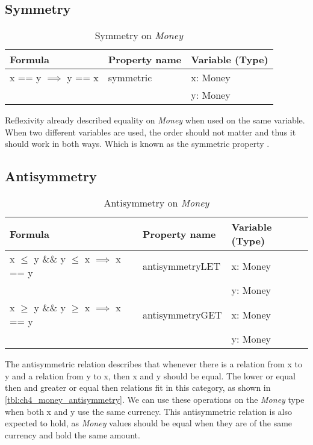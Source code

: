 \subsection*{Symmetry}
\FloatBarrier
\begin{table}[!ht]
\centering
\begin{tabular}{lll}
\hline
                        \textbf{Formula}         & \textbf{Property name} & \textbf{Variable (Type)} \\ \hline
\rowcolor[HTML]{EFEFEF} x == y $\implies$ y == x & symmetric              & x: Money                 \\
\rowcolor[HTML]{EFEFEF}                          &                        & y: Money                 \\ \hline
\end{tabular}
\caption{Symmetry on \textit{Money}}
\label{tbl:ch4_money_symmetry}
\end{table}
\FloatBarrier
Reflexivity already described equality on \textit{Money} when used on the same variable. When two different variables are used, the order should not matter and thus it should work in both ways. Which is known as the symmetric property \cite{raftery2011perspective}.

\subsection*{Antisymmetry}
\FloatBarrier
\begin{table}[!ht]
\centering
\begin{tabular}{lll}
\hline
                        \textbf{Formula}                             & \textbf{Property name} & \textbf{Variable (Type)} \\ \hline
\rowcolor[HTML]{EFEFEF} x $\leq$ y \&\& y $\leq$ x $\implies$ x == y & antisymmetryLET        & x: Money                 \\
\rowcolor[HTML]{EFEFEF}                                              &                        & y: Money                 \\
                        x $\geq$ y \&\& y $\geq$ x $\implies$ x == y & antisymmetryGET        & x: Money                 \\
                                                                     &                        & y: Money                 \\ \hline
\end{tabular}
\caption{Antisymmetry on \textit{Money}}
\label{tbl:ch4_money_antisymmetry}
\end{table}
\FloatBarrier
The antisymmetric relation describes that whenever there is a relation from x to y and a relation from y to x, then x and y should be equal. The lower or equal then and greater or equal then relations fit in this category, as shown in \autoref{tbl:ch4_money_antisymmetry}. We can use these operations on the \textit{Money} type when both x and y use the same currency. This antisymmetric relation is also expected to hold, as \textit{Money} values should be equal when they are of the same currency and hold the same amount.

